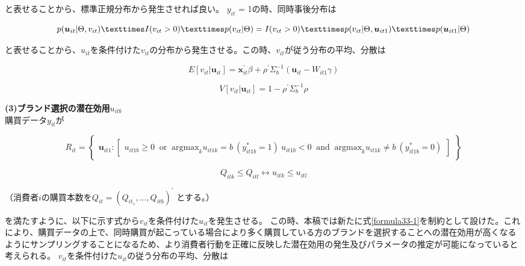 \documentclass[11pt]{jsarticle}
\begin{document}
と表せることから、標準正規分布から発生させれば良い。
$y_{it}$ = 1の時、同時事後分布は

\begin{equation}\label{formula38}
p({\boldsymbol u}_{it}|\Theta,v_{it})×I(v_{it}>0)×p(v_{it}|\Theta)\\
=I(v_{it}>0)×p(v_{it}|\Theta,{\boldsymbol u}_{it1})×p({\boldsymbol u}_{it1}|\Theta)
\end{equation}

と表せることから、$u_{it}$を条件付けた$v_{it}$の分布から発生させる。この時、$v_{it}$が従う分布の平均、分散は

\begin{equation}\label{formula39}
E[v_{it}|{\boldsymbol u}_{it}]=\textbf{x}_{it}^{'}\beta+\rho^{'}\Sigma_{b}^{-1}({\boldsymbol u_{it}}-W_{it1}\gamma)
\end{equation}

\begin{equation}\label{formula40}
V[v_{it}|{\boldsymbol u}_{it}] = 1-\rho^{'}\Sigma_{b}^{-1}\rho
\end{equation}

{\bf (3)ブランド選択の潜在効用$u_{itb}$}\\
購買データ$y_{it}$が

\begin{equation} \label{formula33}
R_{it} =
\begin{Bmatrix}
{\boldsymbol u}_{it1} :
\begin{bmatrix}
u_{it1b} \geq 0 \;\; \mbox{or} \;\; \mbox{argmax}_{k}u_{it1k} = b \
(y^\ast_{it1b} = 1) \
u_{it1b} < 0 \;\; \mbox{and} \;\; \mbox{argmax}_{k}u_{it1k} \neq b \
(y^\ast_{it1b} = 0)
\end{bmatrix}
\end{Bmatrix}
\end{equation}

\begin{equation} \label{formula33-1}
Q_{itk} \leq Q_{itl} \longleftrightarrow u_{itk} \leq u_{itl}
\end{equation}

\begin{center}
（消費者$i$の購買本数を$Q_{it} = (Q_{it_{1}}, \ldots, Q_{itb})^{\prime}$ とする。）
\end{center}

を満たすように、以下に示す式から$v_{it}$を条件付けた$u_{it}$を発生させる。
この時、本稿では新たに式\ref{formula33-1}を制約として設けた。これにより、購買データの上で、同時購買が起こっている場合により多く購買している方のブランドを選択することへの潜在効用が高くなるようにサンプリングすることになるため、より消費者行動を正確に反映した潜在効用の発生及びパラメータの推定が可能になっていると考えられる。
$v_{it}$を条件付けた$u_{it}$の従う分布の平均、分散は
\end{document}
